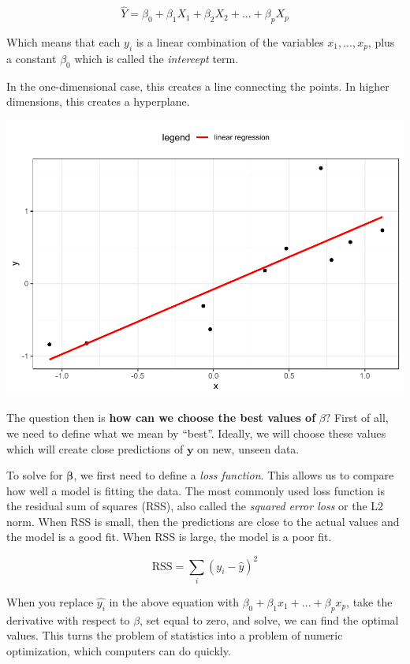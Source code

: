 \documentclass[openany]{book}
\begin{document}
\[
\hat{Y} = \beta_0 + \beta_1 X_1 + \beta_2 X_2 + ... + \beta_p X_p
\]

Which means that each \(y_i\) is a linear combination of the variables \(x_1, ..., x_p\), plus a constant \(\beta_0\) which is called the \emph{intercept} term.

In the one-dimensional case, this creates a line connecting the points. In higher dimensions, this creates a hyperplane.

\includegraphics{05-linear-models_files/figure-latex/unnamed-chunk-2-1.pdf}

The question then is \textbf{how can we choose the best values of} \(\beta?\) First of all, we need to define what we mean by ``best''. Ideally, we will choose these values which will create close predictions of \(\mathbf{y}\) on new, unseen data.

To solve for \(\mathbf{\beta}\), we first need to define a \emph{loss function}. This allows us to compare how well a model is fitting the data. The most commonly used loss function is the residual sum of squares (RSS), also called the \emph{squared error loss} or the L2 norm. When RSS is small, then the predictions are close to the actual values and the model is a good fit. When RSS is large, the model is a poor fit.

\[
\text{RSS} = \sum_i(y_i - \hat{y})^2
\]

When you replace \(\hat{y_i}\) in the above equation with \(\beta_0 + \beta_1 x_1 + ... + \beta_p x_p\), take the derivative with respect to \(\beta\), set equal to zero, and solve, we can find the optimal values. This turns the problem of statistics into a problem of numeric optimization, which computers can do quickly.
\end{document}

